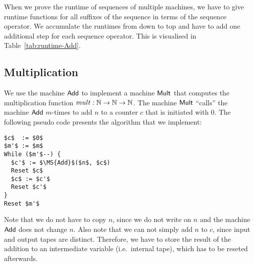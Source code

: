 When we prove the runtime of sequences of multiple machines, we have to give runtime functions for all suffixes of the sequence in terms of the
sequence operator.  We accumulate the runtimes from down to top and have to add one additional step for each sequence operator.  This is visualised in
Table~\ref{tab:runtime-Add}.


\subsection{Multiplication}
\label{sec:Mult}

We use the machine $\mathsf{Add}$ to implement a machine $\mathsf{Mult}$ that computes the multiplication function $mult : \mathbb{N}\rightarrow\mathbb{N}\rightarrow\mathbb{N}$.  The machine
$\mathsf{Mult}$ ``calls'' the machine $\mathsf{Add}$ $m$-times to add $n$ to a counter $c$ that is initiated with $0$.  The following pseudo code presents the
algorithm that we implement: { \small
\begin{lstlisting}[style=pseudocode]
$c$  := $0$
$m'$ := $m$
While ($m'$--) {
  $c'$ := $\MS{Add}$($n$, $c$)
  Reset $c$
  $c$ := $c'$
  Reset $c'$
}
Reset $m'$
\end{lstlisting}
}%
Note that we do not have to copy $n$, since we do not write on $n$ and the machine $\mathsf{Add}$ does not change
$n$.  Also note that we can not simply add $n$ to $c$, since input and output tapes are distinct.  Therefore, we have to store the result of the
addition to an intermediate variable (i.e.\ internal tape), which has to be reseted afterwards.

